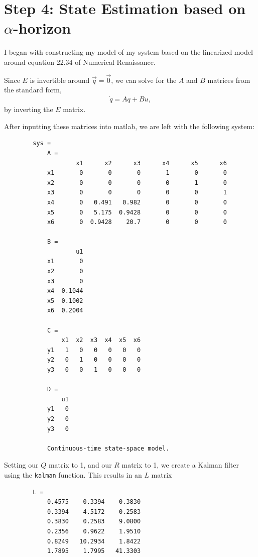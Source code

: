 \documentclass{article}
\theoremstyle{definition}
\begin{document}
    \section*{Step 4: State Estimation based on $\alpha$-horizon}
    I began with constructing my model of my system based on the linearized
    model around equation 22.34 of Numerical Renaissance. 

    Since $E$ is invertible around $\vec q = \vec 0$, we can solve for 
    the $A$ and $B$ matrices from the standard form,
    \begin{eqnarray*}
        \dot q = A q + B u,
    \end{eqnarray*}
    by inverting the $E$ matrix. 

    After inputting these matrices into matlab, we are left with the following system:
    \begin{verbatim}
        sys =
            A = 
                    x1      x2      x3      x4      x5      x6
            x1       0       0       0       1       0       0
            x2       0       0       0       0       1       0
            x3       0       0       0       0       0       1
            x4       0   0.491   0.982       0       0       0
            x5       0   5.175  0.9428       0       0       0
            x6       0  0.9428    20.7       0       0       0
            
            B = 
                    u1
            x1       0
            x2       0
            x3       0
            x4  0.1044
            x5  0.1002
            x6  0.2004
            
            C = 
                x1  x2  x3  x4  x5  x6
            y1   1   0   0   0   0   0
            y2   0   1   0   0   0   0
            y3   0   0   1   0   0   0
            
            D = 
                u1
            y1   0
            y2   0
            y3   0
            
            Continuous-time state-space model.
    \end{verbatim}
    Setting our $Q$ matrix to 1, and our $R$ matrix to 1,
    we create a Kalman filter using the \texttt{kalman} function.
    This results in an $L$ matrix 
    \begin{verbatim}
        L =
            0.4575    0.3394    0.3830
            0.3394    4.5172    0.2583
            0.3830    0.2583    9.0800
            0.2356    0.9622    1.9510
            0.8249   10.2934    1.8422
            1.7895    1.7995   41.3303
    \end{verbatim}
\end{document}

